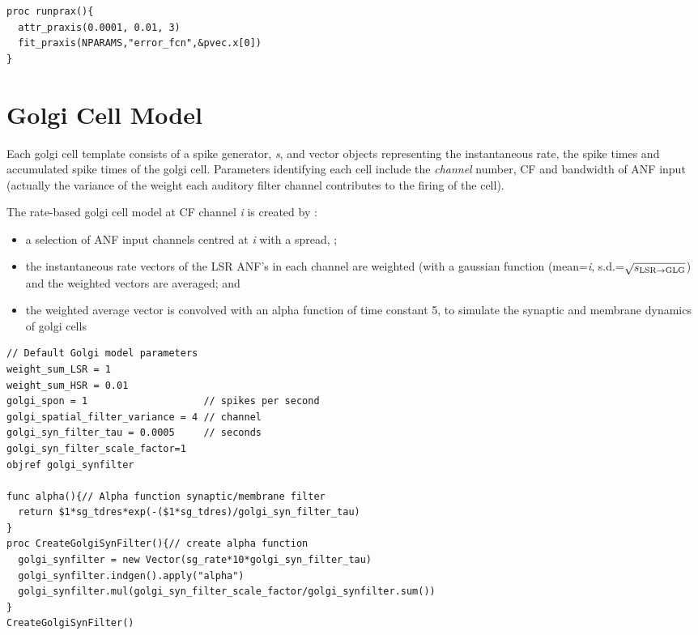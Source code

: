 \begin{lstlisting}[label=lbl:runprax,caption=Set optimisation attributes and run
  fitting procedure.]
proc runprax(){
  attr_praxis(0.0001, 0.01, 3)
  fit_praxis(NPARAMS,"error_fcn",&pvec.x[0])
}
\end{lstlisting}

\section{Golgi Cell Model}

Each golgi cell template consists of a spike generator, \emph{s}, and vector
objects representing the instantaneous rate, the spike times and accumulated
spike times of the golgi cell. Parameters identifying each cell include the
\emph{channel} number, CF and bandwidth of ANF input (actually the variance of
the weight each auditory filter channel contributes to the firing of the cell).

The rate-based golgi cell model at CF channel \emph{i} is
created by :
\begin{itemize}
\item a selection of ANF input channels centred at \emph{i} with a spread,
  \sLSRGLG;
\item the instantaneous rate vectors of the LSR ANF's in each channel are
  weighted (with a gaussian function (mean=\emph{i}, s.d.=$\sqrt{\protect s_{\protect\textrm{{LSR}}\to\textrm{{GLG}}}}$) and
  the weighted vectors are averaged; and
\item the weighted average vector is convolved with an alpha function of time
  constant 5, to simulate the synaptic and membrane dynamics of golgi cells
\end{itemize}

 \medskip{}

 \begin{lstlisting}[label=lstGolgiSyn,caption=Create golgi cell rate vector
   within Golgi template (in CNcell.tem)]
// Default Golgi model parameters 
weight_sum_LSR = 1
weight_sum_HSR = 0.01
golgi_spon = 1                    // spikes per second
golgi_spatial_filter_variance = 4 // channel 
golgi_syn_filter_tau = 0.0005     // seconds 
golgi_syn_filter_scale_factor=1
objref golgi_synfilter

func alpha(){// Alpha function synaptic/membrane filter 
  return $1*sg_tdres*exp(-($1*sg_tdres)/golgi_syn_filter_tau)
}
proc CreateGolgiSynFilter(){// create alpha function 
  golgi_synfilter = new Vector(sg_rate*10*golgi_syn_filter_tau)
  golgi_synfilter.indgen().apply("alpha")  
  golgi_synfilter.mul(golgi_syn_filter_scale_factor/golgi_synfilter.sum()) 
}
CreateGolgiSynFilter()
\end{lstlisting}


